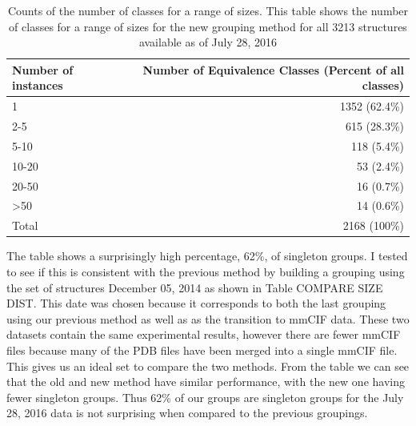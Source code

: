 \begin{table}
  \begin{tabular}{lr}
    \toprule
    Number of instances & Number of Equivalence Classes (Percent of all classes) \\
    \midrule
    1               & 1352 (62.4\%) \\
    2-5             & 615 (28.3\%)  \\
    5-10            & 118 (5.4\%)   \\
    10-20           & 53 (2.4\%)    \\
    20-50           & 16 (0.7\%)    \\
    \textgreater 50 & 14 (0.6\%)    \\
    Total           & 2168 (100\%)  \\
    \bottomrule
  \end{tabular}
  \caption{Counts of the number of classes for a range of sizes. This table
    shows the number of classes for a range of sizes for the new grouping method
  for all 3213 structures available as of July 28, 2016}
  \label{tab:eq-size-dist}
\end{table}

The table shows a surprisingly high percentage, 62\%, of singleton groups. I
tested to see if this is consistent with the previous method by building a
grouping using the set of structures December 05, 2014 as shown in Table COMPARE
SIZE DIST. This date was chosen because it corresponds to both the last grouping
using our previous method as well as as the transition to mmCIF data. These two
datasets contain the same experimental results, however there are fewer mmCIF
files because many  of the PDB files have been merged into a single mmCIF file.
This gives us an ideal set to compare the two methods. From the table we can see
that the old and new method have similar performance, with the new one having
fewer singleton groups. Thus 62\% of our groups are singleton groups for the July
28, 2016 data is not surprising when compared to the previous groupings.

